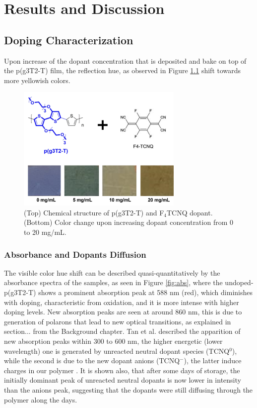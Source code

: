 \chapter{Results and Discussion}
\label{cha:3}

\section{Doping Characterization}

Upon increase of the dopant concentration that is deposited and bake on top of the p(g3T2-T) film, the reflection hue, as observed in Figure \ref{fig:color} shift towards more yellowish colors.

\begin{figure}[ht]
  \centering
  \includegraphics[width=8cm]{Images/pdf/doping_color.pdf}
  \caption[Color shift upon doping level increase]{(Top) Chemical structure of p(g3T2-T) and F$_{4}$TCNQ dopant. (Bottom) Color change upon increasing dopant concentration from 0 to 20 mg/mL.}
  \label{fig:color}
\end{figure}

\subsection{Absorbance and Dopants Diffusion}
The visible color hue shift can be described quasi-quantitatively by the absorbance spectra of the samples, as seen in Figure \ref{fig:abs}, where the undoped-p(g3T2-T) shows a prominent absorption peak at 588 nm (red), which diminishes with doping, characteristic from oxidation, and it is more intense with higher doping levels. New absorption peaks are seen at around 860 nm, this is due to generation of polarons that lead to new optical transitions, as explained in section... from the Background chapter. Tan et al. described the apparition of new absorption peaks within 300 to 600 nm, the higher energetic (lower wavelength) one is generated by unreacted neutral dopant species (TCNQ$^{0}$), while the second is due to the new dopant anions (TCNQ$^{-}$), the latter induce charges in our polymer \cite{tanTuningOrganicElectrochemical2022}. It is shown also, that after some days of storage, the initially dominant peak of unreacted neutral dopants is now lower in intensity than the anions peak, suggesting that the dopants were still diffusing through the polymer along the days. 

